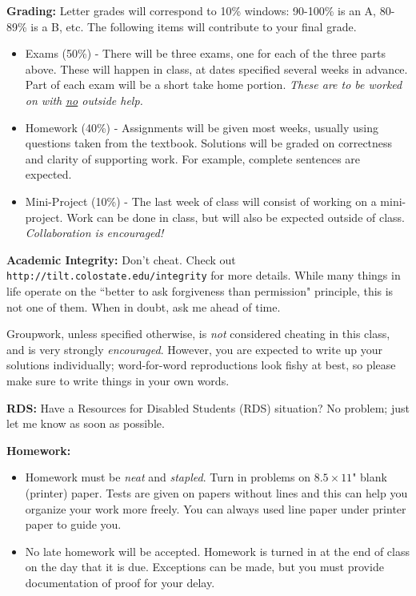 \documentclass[12pt]{amsbook}
\begin{document}
\textbf{Grading:} Letter grades will correspond to 10\% windows: 90-100\% is an A, 80-89\% is a B, etc. The following items will contribute to your final grade.
\begin{itemize}
\item Exams (50\%) - There will be three exams, one for each of the three parts above. These will happen in class, at dates specified several weeks in advance. Part of each exam will be a short take home portion. \emph{These are to be worked on with \underline{no} outside help.}
\item Homework (40\%) - Assignments will be given most weeks, usually using questions taken from the textbook. Solutions will be graded on correctness and clarity of supporting work. For example, complete sentences are expected.
\item Mini-Project (10\%) - The last week of class will consist of working on a mini-project.  Work can be done in class, but will also be expected outside of class. \emph{Collaboration is encouraged!}
\end{itemize}

\textbf{Academic Integrity:} Don't cheat. Check out \texttt{http://tilt.colostate.edu/integrity} for more details. While many things in life operate on the ``better to ask forgiveness than permission" principle, this is not one of them. When in doubt, ask me ahead of time.

Groupwork, unless specified otherwise, is \emph{not} considered cheating in this class, and is very strongly \emph{encouraged}. However, you are expected to write up your solutions individually; word-for-word reproductions look fishy at best, so please make sure to write things in your own words.

\textbf{RDS:} Have a Resources for Disabled Students (RDS) situation? No problem; just let me know as soon as possible.

\textbf{Homework:} 
\begin{itemize}
    \item Homework must be \emph{neat} and \emph{stapled}.  Turn in problems on $8.5\times 11$" blank (printer) paper.  Tests are given on papers without lines and this can help you organize your work more freely.  You can always used line paper under printer paper to guide you.
    \item No late homework will be accepted.  Homework is turned in at the end of class on the day that it is due. Exceptions can be made, but you must provide documentation of proof for your delay.
\end{itemize}
\end{document}
